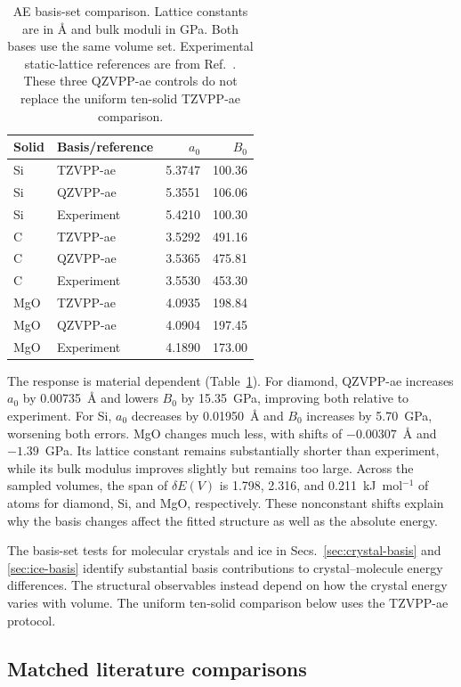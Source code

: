 \documentclass[10pt,a4paper]{article}
\begin{document}
\begin{table}[htbp]
\centering\small
\caption{AE basis-set comparison. Lattice constants are in \AA{} and bulk moduli in GPa. Both bases use the same volume set. Experimental static-lattice references are from Ref.~. These three QZVPP-ae controls do not replace the uniform ten-solid TZVPP-ae comparison.}
\label{tab:solid-basis}
\begin{tabular}{llrr}
\toprule
Solid & Basis/reference & $a_0$ & $B_0$\\
\midrule
Si & TZVPP-ae & 5.3747 & 100.36\\
Si & QZVPP-ae & 5.3551 & 106.06\\
Si & Experiment & 5.4210 & 100.30\\
C & TZVPP-ae & 3.5292 & 491.16\\
C & QZVPP-ae & 3.5365 & 475.81\\
C & Experiment & 3.5530 & 453.30\\
MgO & TZVPP-ae & 4.0935 & 198.84\\
MgO & QZVPP-ae & 4.0904 & 197.45\\
MgO & Experiment & 4.1890 & 173.00\\
\bottomrule
\end{tabular}
\end{table}


The response is material dependent (Table~\ref{tab:solid-basis}). For diamond, QZVPP-ae increases $a_0$ by 0.00735~\AA{} and lowers $B_0$ by 15.35~GPa, improving both relative to experiment. For Si, $a_0$ decreases by 0.01950~\AA{} and $B_0$ increases by 5.70~GPa, worsening both errors. MgO changes much less, with shifts of $-0.00307$~\AA{} and $-1.39$~GPa. Its lattice constant remains substantially shorter than experiment, while its bulk modulus improves slightly but remains too large. Across the sampled volumes, the span of $\delta E(V)$ is 1.798, 2.316, and 0.211~kJ~mol$^{-1}$ of atoms for diamond, Si, and MgO, respectively. These nonconstant shifts explain why the basis changes affect the fitted structure as well as the absolute energy.

The basis-set tests for molecular crystals and ice in Secs.~\ref{sec:crystal-basis} and \ref{sec:ice-basis} identify substantial basis contributions to crystal--molecule energy differences. The structural observables instead depend on how the crystal energy varies with volume. The uniform ten-solid comparison below uses the TZVPP-ae protocol.

\subsection{Matched literature comparisons}
\label{sec:solid-literature}
\end{document}
